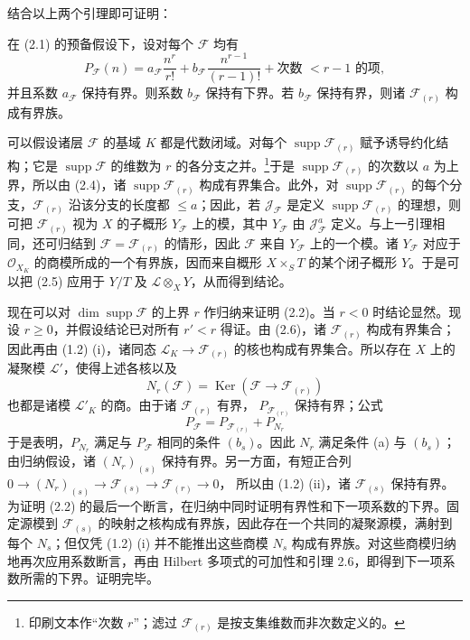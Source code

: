 结合以上两个引理即可证明：

 在 (2.1) 的预备假设下，设对每个 $\mathcal F$ 均有
\[
P_{\mathcal F}(n)=a_{\mathcal F}\frac{n^r}{r!}
+b_{\mathcal F}\frac{n^{r-1}}{(r-1)!}
+\text{次数 $<r-1$ 的项},
\]
并且系数 $a_{\mathcal F}$ 保持有界。则系数 $b_{\mathcal F}$ 保持有下界。若 $b_{\mathcal F}$ 保持有界，则诸 $\mathcal F_{(r)}$ 构成有界族。

可以假设诸层 $\mathcal F$ 的基域 $K$ 都是代数闭域。对每个
$\operatorname{supp}\mathcal F_{(r)}$ 赋予诱导约化结构；它是
$\operatorname{supp}\mathcal F$ 的维数为 $r$ 的各分支之并。\footnote{印刷文本作“次数 $r$”；滤过 $\mathcal F_{(r)}$ 是按支集维数而非次数定义的。}于是
$\operatorname{supp}\mathcal F_{(r)}$ 的次数以 $a$ 为上界，所以由
(2.4)，诸 $\operatorname{supp}\mathcal F_{(r)}$ 构成有界集合。此外，对
$\operatorname{supp}\mathcal F_{(r)}$ 的每个分支，$\mathcal F_{(r)}$ 沿该分支的长度都 $\leq a$；因此，若 $\mathcal J_{\mathcal F}$ 是定义
$\operatorname{supp}\mathcal F_{(r)}$ 的理想，则可把
$\mathcal F_{(r)}$
视为 $X$ 的子概形 $Y_{\mathcal F}$ 上的模，其中
$Y_{\mathcal F}$ 由 $\mathcal J_{\mathcal F}^{a}$ 定义。与上一引理相同，还可归结到 $\mathcal F=\mathcal F_{(r)}$ 的情形，因此
$\mathcal F$ 来自 $Y_{\mathcal F}$ 上的一个模。诸 $Y_{\mathcal F}$ 对应于
$\mathcal O_{X_K}$ 的商模所成的一个有界族，因而来自概形
$X\times_S T$ 的某个闭子概形 $Y$。于是可以把 (2.5) 应用于
$Y/T$ 及 $\mathcal L\otimes_XY$，从而得到结论。

现在可以对 $\dim\operatorname{supp}\mathcal F$ 的上界 $r$ 作归纳来证明
(2.2)。当 $r<0$ 时结论显然。现设 $r\geq0$，并假设结论已对所有
$r'<r$ 得证。由 (2.6)，诸 $\mathcal F_{(r)}$ 构成有界集合；因此再由
(1.2) (i)，诸同态
$\mathcal L_K\longrightarrow\mathcal F_{(r)}$ 的核也构成有界集合。所以存在 $X$ 上的凝聚模 $\mathcal L'$，使得上述各核以及
\[
N_r(\mathcal F)=\operatorname{Ker}(\mathcal F\longrightarrow\mathcal F_{(r)})
\]
也都是诸模 $\mathcal L'_K$ 的商。由于诸 $\mathcal F_{(r)}$ 有界，
$P_{\mathcal F_{(r)}}$ 保持有界；公式
\[
P_{\mathcal F}=P_{\mathcal F_{(r)}}+P_{N_r}
\]
于是表明，$P_{N_r}$ 满足与 $P_{\mathcal F}$ 相同的条件 $(b_s)$。因此
$N_r$ 满足条件 (a) 与 $(b_s)$；由归纳假设，诸
$(N_r)_{(s)}$ 保持有界。另一方面，有短正合列
$0\longrightarrow(N_r)_{(s)}\longrightarrow\mathcal F_{(s)}
\longrightarrow\mathcal F_{(r)}\longrightarrow0$，
所以由 (1.2) (ii)，诸 $\mathcal F_{(s)}$ 保持有界。为证明 (2.2) 的最后一个断言，在归纳中同时证明有界性和下一项系数的下界。固定源模到 $\mathcal F_{(s)}$ 的映射之核构成有界族，因此存在一个共同的凝聚源模，满射到每个 $N_s$；但仅凭 (1.2) (i) 并不能推出这些商模 $N_s$ 构成有界族。对这些商模归纳地再次应用系数断言，再由 Hilbert 多项式的可加性和引理 2.6，即得到下一项系数所需的下界。证明完毕。

